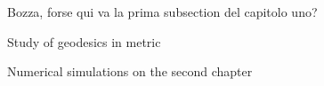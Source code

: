 Bozza, forse qui va la prima subsection del capitolo uno?

Study of geodesics in \Sh metric

Numerical simulations on the second chapter

